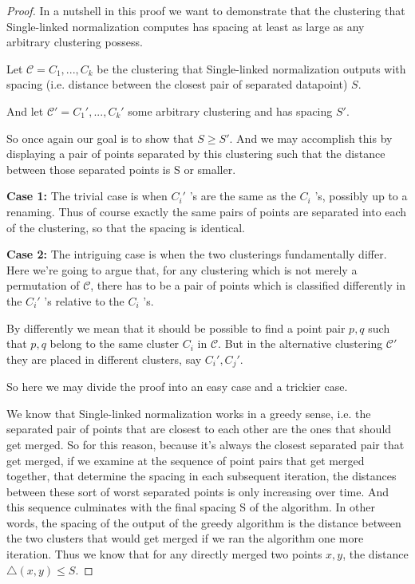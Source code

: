 \documentclass{article}
\newcommand{\clusterset}{\mathcal{C}}   %
\begin{document}
\begin{proof}
In a nutshell in this proof we want to demonstrate that the clustering that Single-linked normalization computes has spacing at least as large as any arbitrary clustering possess. 

Let $\clusterset = C_1,...,C_k$ be the clustering that Single-linked normalization outputs with spacing (i.e. distance between the closest pair of separated datapoint) $S$.

And let $\clusterset' = C_1',...,C_k'$ some arbitrary clustering and has spacing $S'$.

So once again our goal is to show that $S \geq S'$. And we may accomplish this by displaying a pair of points separated by this clustering such that the distance between those separated points is S or smaller.

\textbf{Case 1:} The trivial case is when $C_i'$ 's are the same as the $C_i$ 's, possibly up to a renaming. Thus of course  exactly the same pairs of points are 
separated into each of the clustering, so that the spacing is identical. 

\textbf{Case 2:} The intriguing case is when the two clusterings fundamentally differ. Here we're going to argue  that, for any clustering which is not  merely a permutation of $\clusterset$, there has to be a pair of points which is classified differently in the  $C_i'$ 's relative to the $C_i$ 's. 

By differently we mean that it should be possible to find a point pair $p, q$ such that $p, q$ belong to the same cluster $C_i$ in $\clusterset$. But in the alternative clustering $\clusterset'$ they are placed in different clusters, say $C_i', C_j'$.

So here we may divide the proof into an easy case and a trickier case.

We know that Single-linked normalization works in a greedy sense, i.e. the separated pair of points  that are closest to each other are the 
ones that should get merged. So for this reason, because it's always the closest separated pair that get merged, if we examine at the sequence of 
point pairs that get merged together, that determine the spacing in each subsequent iteration, the distances between these sort of worst separated points is only increasing over time. And this sequence culminates with the final spacing S of the algorithm. In other words, the spacing of the output of the greedy algorithm is the distance between the two clusters that would get merged if we ran the algorithm one more iteration. Thus we know that for any directly merged two points $x, y$,  the distance $\bigtriangleup (x, y) \leq S$.


\end{proof}
\end{document}

